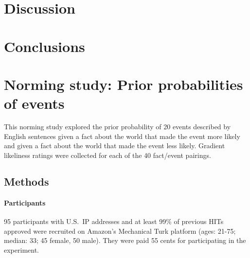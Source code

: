 \documentclass[11pt,fleqn]{article}
\newcommand{\6}{\mbox{$[\hspace*{-.6mm}[$}}
\newcommand{\9}{\mbox{$]\hspace*{-.6mm}]$}}
\begin{document}
\section{Discussion}

\section{Conclusions}\label{s6}


\appendix

\setcounter{table}{0}
\renewcommand{\thetable}{A\arabic{table}}

\setcounter{figure}{0}
\renewcommand{\thefigure}{A\arabic{figure}}

\section{Norming study: Prior probabilities of events}\label{s-norming}

This norming study explored the prior probability of 20 events described by English sentences given a fact about the world that made the event more likely and given a fact about the world that made the event less likely. Gradient likeliness ratings were collected for each of the 40 fact/event pairings.

\subsection{Methods}\label{s-methods-1}

\paragraph{Participants} 95 participants with U.S.\ IP addresses and at least 99\% of previous HITs approved were recruited on Amazon's Mechanical Turk platform (ages: 21-75; median: 33; 45 female, 50 male). They were paid 55 cents for participating in the experiment. 
\end{document}
